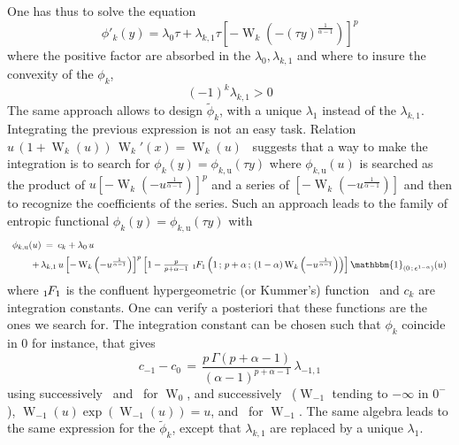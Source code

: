 \documentclass[english,sort&compress]{elsarticle}
\theoremstyle{definition}
\theoremstyle{plain}
\theoremstyle{plain}
\def\X{\mathcal{X}}
\def\un{\mathbbm{1}}
\def\W{\operatorname{W}}
\newcommand{\hypgeom}[2]{\mbox{}_{#1}\hspace{-1pt}F_{#2}}
\begin{document}
One has thus to solve the equation
%
\[
\phi'_k(y) =  \lambda_0 \tau  + \lambda_{k,1} \tau  \left[ - \W_k\left(  - (\tau
    y)^{\frac{1}{\alpha - 1}} \right) \right]^p
\]
%
where the  positive factor  are absorbed in  the $\lambda_0,  \lambda_{k,1}$ and
where to insure the convexity of the $\phi_k$,
%
\[
(-1)^k \lambda_{k,1} > 0
\]
%
The  same  approach  allows  to   design  $\widetilde{\phi}_k$,  with  a  unique
$\lambda_1$ instead of the $\lambda_{k,1}$.  Integrating the previous expression
is   not  an   easy   task.   Relation   $u  \,   (1+\W_k(u))   \,  \W_k'(x)   =
\W_k(u)$~\cite[Eq.~3.2]{CorGon96} suggests that a way to make the integration is
to    search   for    $\phi_k(y)    =    \phi_{k,\mathrm{u}}(\tau   y)$    where
$\phi_{k,\mathrm{u}}(u)$ is searched  as the product of $u  \left[- \W_k\left( -
  u^{\frac{1}{\alpha-1}}  \right)  \right]^p  $  and   a  series  of  $\left[  -
  \W_k\left( - u^{\frac{1}{\alpha-1}} \right) \right]$ and then to recognize the
coefficients of  the series. Such  an approach leads  to the family  of entropic
functional $\phi_k(y) = \phi_{k,\mathrm{u}}(\tau y)$ with
%
\[\begin{array}{l}
\phi_{k,\mathrm{u}}(u) \: = \: c_k + \lambda_0 \, u\\[2mm]
%
\hspace{7.5mm} + \, \lambda_{k,1} \, u \left[ - \W_k\left(
    -   u^{\frac{1}{\alpha-1}}   \right)  \right]^p   \left[   1  -
  \frac{p}{p+\alpha-1} \,  \, \hypgeom{1}{1}\left(  1 \, ;  \, p+\alpha \,  ; \,
    (1-\alpha)  \W_k   \left(  -  u^{\frac{1}{\alpha-1}}  \right)
  \right) \right] \un_{\left( 0 \, ; \, e^{1-\alpha} \right)}(u)
\end{array}\]
%
where   $\hypgeom{1}{1}$  is   the   confluent   hypergeometric  (or   Kummer's)
function~\cite[\S~13]{AbrSte70}  and $c_k$  are integration  constants. One  can
verify  a posteriori  that  these functions  are  the ones  we  search for.  The
integration constant
can be chosen such that $\phi_k$ coincide in 0 for instance, that gives
%
\[
c_{-1} - c_0 \,  = \, \frac{p \, \Gamma(p+\alpha-1)}{(\alpha-1)^{p+\alpha-1}} \,
\lambda_{-1,1}
\]
%
using successively~\cite[Eq.~3.1]{CorGon96}  and~\cite[Eq.~13.1.2]{AbrSte70} for
$\W_0$,  and  successively~\cite[Eq.~13.1.4]{AbrSte70}   ($\W_{-1}$  tending  to
$-\infty$ in  $0^{-}$), $\W_{-1}(u) \exp(\W_{-1}(u)) =  u$, and~\cite[Eq.~4.6 \&
  lines that  follow]{CorGon96} for  $\W_{-1}$.  The same  algebra leads  to the
same expression  for the  $\widetilde{\phi}_k$, except that  $\lambda_{k,1}$ are
replaced by a unique $\lambda_1$.
\end{document}
